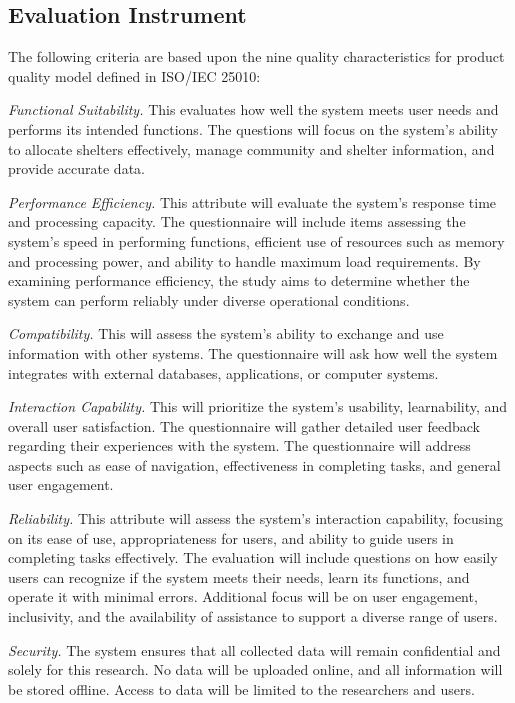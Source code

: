\subsection{Evaluation Instrument}
	The following criteria are based upon the nine quality characteristics for product quality model defined in ISO/IEC 25010:
	
	\textit{Functional Suitability.} This evaluates how well the system meets user needs and performs its intended functions. The questions will focus on the system's ability to allocate shelters effectively, manage community and shelter information, and provide accurate data.
	
	\textit{Performance Efficiency.} This attribute will evaluate the system's response time and processing capacity. The questionnaire will include items assessing the system's speed in performing functions, efficient use of resources such as memory and processing power, and ability to handle maximum load requirements. By examining performance efficiency, the study aims to determine whether the system can perform reliably under diverse operational conditions.
	
	\textit{Compatibility.} This will assess the system’s ability to exchange and use information with other systems. The questionnaire will ask how well the system integrates with external databases, applications, or computer systems. 
	
	\textit{Interaction Capability.} This will prioritize the system's usability, learnability, and overall user satisfaction. The questionnaire will gather detailed user feedback regarding their experiences with the system. The questionnaire will address aspects such as ease of navigation, effectiveness in completing tasks, and general user engagement.
	
	\textit{Reliability.} This attribute will assess the system's interaction capability, focusing on its ease of use, appropriateness for users, and ability to guide users in completing tasks effectively. The evaluation will include questions on how easily users can recognize if the system meets their needs, learn its functions, and operate it with minimal errors. Additional focus will be on user engagement, inclusivity, and the availability of assistance to support a diverse range of users. 
	
	\textit{Security.} The system ensures that all collected data will remain confidential and solely for this research. No data will be uploaded online, and all information will be stored offline. Access to data will be limited to the researchers and users.
	
